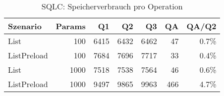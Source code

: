 \begin{table}[ht]
\centering
\caption{SQLC: Speicherverbrauch pro Operation}
\begin{tabular}{lrrrrrr}
\toprule
Szenario & Params & Q1 & Q2 & Q3 & QA & QA/Q2 \\
\midrule
		List & 100 & 6415 & 6432 & 6462 & 47 & 0.7\% \\
		ListPreload & 100 & 7684 & 7696 & 7717 & 33 & 0.4\% \\
		List & 1000 & 7518 & 7538 & 7564 & 46 & 0.6\% \\
		ListPreload & 1000 & 9497 & 9865 & 9963 & 466 & 4.7\% \\
\bottomrule
\end{tabular}
\label{tab:benchmark_sqlc_bytesperop}
\end{table}
	